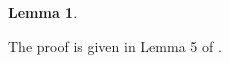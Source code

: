 \documentclass{article}
\newtheorem{lemma}[theorem]{Lemma}
\newcommand{\R}{\mathbb{R}}
\begin{document}
\begin{appendices}
\begin{lemma}
\end{lemma}
The proof is given in Lemma 5 of \cite{Kumar_2021}.



\end{appendices}
\end{document}
